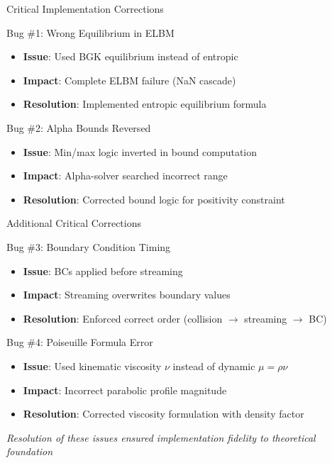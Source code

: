 \documentclass[aspectratio=169]{beamer}
\begin{document}
\begin{frame}{Critical Implementation Corrections}
\begin{block}{Bug \#1: Wrong Equilibrium in ELBM}
\begin{itemize}
    \item \textbf{Issue}: Used BGK equilibrium instead of entropic
    \item \textbf{Impact}: Complete ELBM failure (NaN cascade)
    \item \textbf{Resolution}: Implemented entropic equilibrium formula
\end{itemize}
\end{block}

\begin{block}{Bug \#2: Alpha Bounds Reversed}
\begin{itemize}
    \item \textbf{Issue}: Min/max logic inverted in bound computation
    \item \textbf{Impact}: Alpha-solver searched incorrect range
    \item \textbf{Resolution}: Corrected bound logic for positivity constraint
\end{itemize}
\end{block}
\end{frame}

\begin{frame}{Additional Critical Corrections}
\begin{block}{Bug \#3: Boundary Condition Timing}
\begin{itemize}
    \item \textbf{Issue}: BCs applied before streaming
    \item \textbf{Impact}: Streaming overwrites boundary values
    \item \textbf{Resolution}: Enforced correct order (collision $\rightarrow$ streaming $\rightarrow$ BC)
\end{itemize}
\end{block}

\begin{block}{Bug \#4: Poiseuille Formula Error}
\begin{itemize}
    \item \textbf{Issue}: Used kinematic viscosity $\nu$ instead of dynamic $\mu = \rho\nu$
    \item \textbf{Impact}: Incorrect parabolic profile magnitude
    \item \textbf{Resolution}: Corrected viscosity formulation with density factor
\end{itemize}
\end{block}

\vspace{0.2cm}
\textit{Resolution of these issues ensured implementation fidelity to theoretical foundation}
\end{frame}
\end{document}
